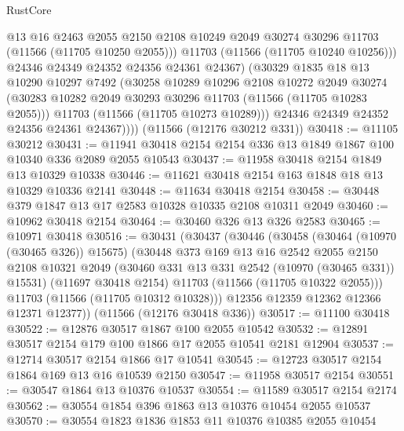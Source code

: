 \begin{lexlean}{RustCore}
\begin{coremodule}
                @13
                @16
                @2463
                @2055
                @2150
                @2108
                @10249
                @2049
                @30274
                @30296
                @11703
                (@11566 (@11705 @10250 @2055)))
              @11703
              (@11566 (@11705 @10240 @10256)))
            @24346
            @24349
            @24352
            @24356
            @24361
            @24367)
          (@30329
            @1835
            @18
            @13
            @10290
            @10297
            @7492
            (@30258
              @10289
              @10296
              @2108
              @10272
              @2049
              @30274
              (@30283 @10282 @2049 @30293 @30296 @11703 (@11566 (@11705 @10283 @2055)))
              @11703
              (@11566 (@11705 @10273 @10289)))
            @24346
            @24349
            @24352
            @24356
            @24361
            @24367))))
    (@11566 (@12176 @30212 @331))
@30418 := @11105 @30212
@30431 := @11941 @30418 @2154 @2154 @336 @13 @1849 @1867 @100 @10340 @336 @2089 @2055 @10543
@30437 := @11958 @30418 @2154 @1849 @13 @10329 @10338
@30446 := @11621 @30418 @2154 @163 @1848 @18 @13 @10329 @10336 @2141
@30448 := @11634 @30418 @2154
@30458 := @30448 @379 @1847 @13 @17 @2583 @10328 @10335 @2108 @10311 @2049
@30460 := @10962 @30418 @2154
@30464 := @30460 @326 @13 @326 @2583
@30465 := @10971 @30418
@30516 := @30431
    (@30437
      (@30446
        (@30458
          (@30464 (@10970 (@30465 @326)) @15675)
          (@30448
            @373
            @169
            @13
            @16
            @2542
            @2055
            @2150
            @2108
            @10321
            @2049
            (@30460 @331 @13 @331 @2542 (@10970 (@30465 @331)) @15531)
            (@11697 @30418 @2154)
            @11703
            (@11566 (@11705 @10322 @2055)))
          @11703
          (@11566 (@11705 @10312 @10328)))
        @12356
        @12359
        @12362
        @12366
        @12371
        @12377))
    (@11566 (@12176 @30418 @336))
@30517 := @11100 @30418
@30522 := @12876 @30517 @1867 @100 @2055 @10542
@30532 := @12891 @30517 @2154 @179 @100 @1866 @17 @2055 @10541 @2181 @12904
@30537 := @12714 @30517 @2154 @1866 @17 @10541
@30545 := @12723 @30517 @2154 @1864 @169 @13 @16 @10539 @2150
@30547 := @11958 @30517 @2154
@30551 := @30547 @1864 @13 @10376 @10537
@30554 := @11589 @30517 @2154 @2174
@30562 := @30554 @1854 @396 @1863 @13 @10376 @10454 @2055 @10537
@30570 := @30554 @1823 @1836 @1853 @11 @10376 @10385 @2055 @10454

\end{coremodule}
\end{lexlean}
